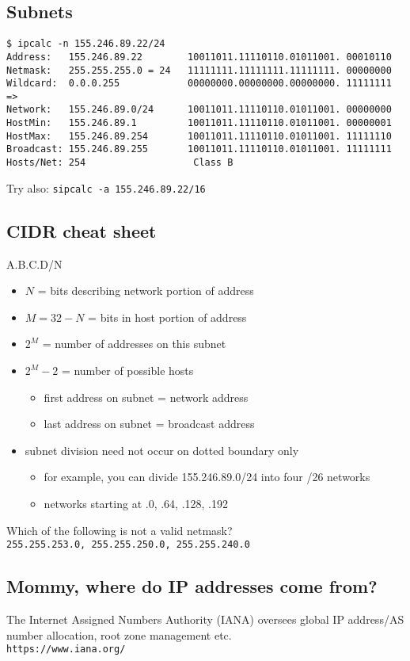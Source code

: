 \documentclass[xga]{xdvislides}
\begin{document}
\subsection{Subnets}
\begin{verbatim}
$ ipcalc -n 155.246.89.22/24
Address:   155.246.89.22        10011011.11110110.01011001. 00010110
Netmask:   255.255.255.0 = 24   11111111.11111111.11111111. 00000000
Wildcard:  0.0.0.255            00000000.00000000.00000000. 11111111
=>
Network:   155.246.89.0/24      10011011.11110110.01011001. 00000000
HostMin:   155.246.89.1         10011011.11110110.01011001. 00000001
HostMax:   155.246.89.254       10011011.11110110.01011001. 11111110
Broadcast: 155.246.89.255       10011011.11110110.01011001. 11111111
Hosts/Net: 254                   Class B
\end{verbatim}
\vspace{.5in}
Try also: \verb+sipcalc -a 155.246.89.22/16+

\subsection{CIDR cheat sheet}
A.B.C.D/N
\begin{itemize}
	\item $N$ = bits describing network portion of address
	\item $M=32-N$ = bits in host portion of address
	\item $2^M$ = number of addresses on this subnet
	\item $2^M - 2$ = number of possible hosts
		\begin{itemize}
			\item first address on subnet = network address
			\item last address on subnet = broadcast address
		\end{itemize}
	\item subnet division need not occur on dotted boundary only
		\begin{itemize}
			\item for example, you can divide 155.246.89.0/24
				into four /26 networks
			\item networks starting at .0, .64, .128, .192
		\end{itemize}
\end{itemize}
\addvspace{.5in}
Which of the following is not a valid netmask? \\
\verb+255.255.253.0, 255.255.250.0, 255.255.240.0+

\subsection{Mommy, where do IP addresses come from?}
\Huge
\vfill
\begin{center}
The Internet Assigned Numbers Authority (IANA) oversees global IP
address/AS number allocation, root zone management etc.
\\
\vspace{.5in}
\verb+https://www.iana.org/+
\end{center}
\vfill
\Normalsize
\end{document}
